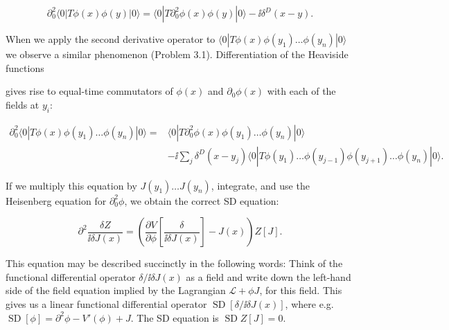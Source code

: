 \begin{equation}
\partial_0^2\langle0|T\phi(x)\phi(y)|0\rangle
=\langle0|T\partial_0^2\phi(x)\phi(y)|0\rangle-\ii\delta^D(x-y).
\label{eq:3.7}
\end{equation}

When we apply the second derivative operator to $\langle0|T\phi(x)\phi(y_1)\ldots\phi(y_n)|0\rangle$ we
observe a similar phenomenon (Problem 3.1). Differentiation of the Heaviside functions

gives rise to equal-time commutators of $\phi(x)$ and $\partial_0\phi(x)$ with each of the fields
at $y_i$:

\begin{equation}
\begin{aligned}
\partial_0^2\langle0|T\phi(x)\phi(y_1)\ldots\phi(y_n)|0\rangle
={}&\langle0|T\partial_0^2\phi(x)\phi(y_1)\ldots\phi(y_n)|0\rangle\\
&-\ii\sum_j\delta^D(x-y_j)\langle0|T\phi(y_1)\ldots\phi(y_{j-1})\phi(y_{j+1})\ldots\phi(y_n)|0\rangle.
\end{aligned}
\label{eq:3.8}
\end{equation}

If we multiply this equation by $J(y_1)\ldots J(y_n)$, integrate, and use the Heisenberg
equation for $\partial_0^2\phi$, we obtain the correct SD equation:

\begin{equation}
\partial^2\frac{\delta Z}{\ii\delta J(x)}
=\left(\frac{\partial V}{\partial\phi}\left[\frac{\delta}{\ii\delta J(x)}\right]-J(x)\right)Z[J].
\label{eq:3.9}
\end{equation}

This equation may be described succinctly in the following words: Think of the
functional differential operator $\delta/\ii\delta J(x)$ as a field and write down the left-hand side of
the field equation implied by the Lagrangian $\mathcal L+\phi J$, for this field. This gives us a linear
functional differential operator $\operatorname{SD}[\delta/\ii\delta J(x)]$, where e.g. $\operatorname{SD}[\phi]=\partial^2\phi-V'(\phi)+J$.
The SD equation is $\operatorname{SD}Z[J]=0$.
